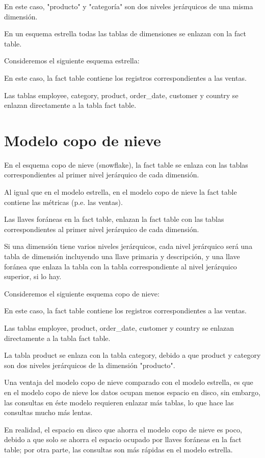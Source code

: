 En este caso, "producto" y "categoría" son dos niveles jerárquicos de una misma dimensión.

En un esquema estrella todas las tablas de dimensiones se enlazan con la fact table.

Consideremos el siguiente esquema estrella:

En este caso, la fact table contiene los registros correspondientes a las ventas.

Las tablas employee, category, product, order\_date, customer y country se enlazan directamente a la tabla fact table.

\section{Modelo copo de nieve}

En el esquema copo de nieve (snowflake), la fact table se enlaza con las tablas correspondientes al primer nivel jerárquico de cada dimensión.

Al igual que en el modelo estrella, en el modelo copo de nieve la fact table contiene las métricas (p.e. las ventas).

Las llaves foráneas en la fact table, enlazan la fact table con las tablas correspondientes al primer nivel jerárquico de cada dimensión.

Si una dimensión tiene varios niveles jerárquicos, cada nivel jerárquico será una tabla de dimensión incluyendo una llave primaria y descripción, y una llave foránea que enlaza la tabla con la tabla correspondiente al nivel jerárquico superior, si lo hay.

Consideremos el siguiente esquema copo de nieve:

En este caso, la fact table contiene los registros correspondientes a las ventas.

Las tablas employee, product, order\_date, customer y country se enlazan directamente a la tabla fact table.

La tabla product se enlaza con la tabla category, debido a que product y category son dos niveles jerárquicos de la dimensión "producto".

Una ventaja del modelo copo de nieve comparado con el modelo estrella, es que en el modelo copo de nieve los datos ocupan menos espacio en disco, sin embargo, las consultas en éste modelo requieren enlazar más tablas, lo que hace las consultas mucho más lentas.

En realidad, el espacio en disco que ahorra el modelo copo de nieve es poco, debido a que solo se ahorra el espacio ocupado por llaves foráneas en la fact table; por otra parte, las consultas son más rápidas en el modelo estrella.

